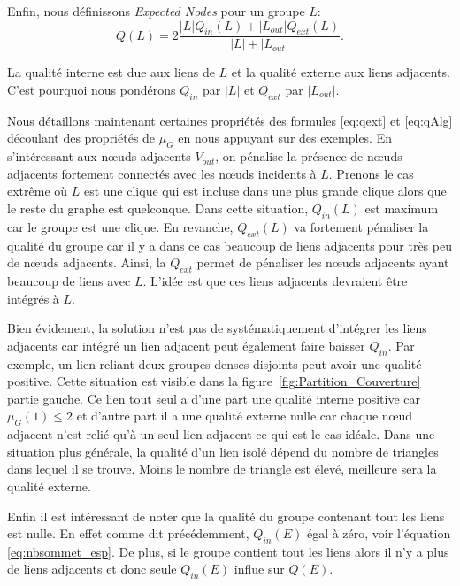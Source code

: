 Enfin, nous définissons \emph{Expected Nodes} pour un groupe $L$:
\begin{equation}
	\label{eq:qAlg}
	Q(L)  =  2\dfrac{ |L|Q_{in}(L) + |L_{out}|Q_{ext}(L)}{|L|+|L_{out}|}.
\end{equation}

La qualité interne est due aux liens de $L$ et la qualité externe aux liens adjacents.
C'est pourquoi nous pondérons $Q_{in}$ par $|L|$ et $Q_{ext}$ par $|L_{out}|$.



Nous détaillons maintenant certaines propriétés des formules \ref{eq:qext} et \ref{eq:qAlg} découlant des propriétés de $\mu_{G}$ en nous appuyant sur des exemples.
En s'intéressant aux n\oe uds adjacents $V_{out}$, on pénalise la présence de n\oe uds adjacents fortement connectés avec les n\oe uds incidents à $L$.
Prenons le cas extrême où $L$ est une clique qui est incluse dans une plus grande clique alors que le reste du graphe est quelconque.
Dans cette situation, $Q_{in}(L)$ est maximum car le groupe est une clique.
En revanche, $Q_{ext}(L)$ va fortement pénaliser la qualité du groupe car il y a dans ce cas beaucoup de liens adjacents pour très peu de n\oe uds adjacents.
Ainsi, la $Q_{ext}$ permet de pénaliser les n\oe uds adjacents ayant beaucoup de liens avec $L$.
L'idée est que ces liens adjacents devraient être intégrés à $L$.

Bien évidement, la solution n'est pas de systématiquement d'intégrer les liens adjacents car intégré un lien adjacent peut également faire baisser $Q_{in}$.
Par exemple, un lien reliant deux groupes denses disjoints peut avoir une qualité positive.
Cette situation est visible dans la figure~\ref{fig:Partition_Couverture} partie gauche.
Ce lien tout seul a d'une part une qualité interne positive car $\mu_G(1) \leq 2$ et d'autre part il a une qualité externe nulle car chaque n\oe ud adjacent n'est relié qu'à un seul lien adjacent ce qui est le cas idéale.
Dans une situation plus générale, la qualité d'un lien isolé dépend du nombre de triangles dans lequel il se trouve.
Moins le nombre de triangle est élevé, meilleure sera la qualité externe.

Enfin il est intéressant de noter que la qualité du groupe contenant tout les liens est nulle.
En effet comme dit précédemment, $Q_{in}(E)$ égal à zéro, voir l'équation \ref{eq:nbsommet_esp}.
De plus, si le groupe contient tout les liens alors il n'y a plus de liens adjacents et donc seule  $Q_{in}(E)$ influe sur $Q(E)$.



